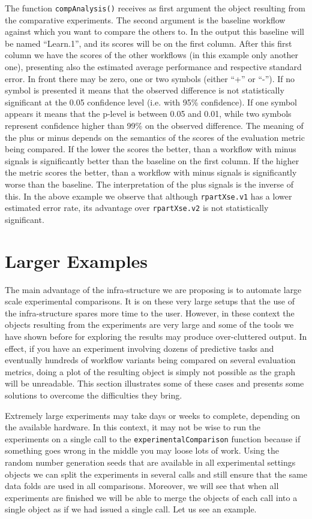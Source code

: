 \documentclass[10pt,a4paper]{article}
\begin{document}
The function \texttt{compAnalysis()} receives as first argument the
object resulting from the comparative experiments. The second argument
is the baseline workflow against which you want to compare the others
to. In the output this baseline will be named ``Learn.1'', and its
scores will be on the first column. After this first column we have
the scores of the other workflows (in this example only another one),
presenting also the estimated average performance and respective
standard error. In front there may be zero, one or two symbols (either
``+'' or ``-''). If no symbol is presented it means that the observed
difference is not statistically significant at the 0.05 confidence
level (i.e. with 95\% confidence). If one symbol appears it means that
the p-level is between 0.05 and 0.01, while two symbols represent
confidence higher than 99\% on the observed difference. The meaning of
the plus or minus depends on the semantics of the scores of the
evaluation metric being compared. If the lower the scores the better,
than a workflow with minus signals is significantly better than the
baseline on the first column. If the higher the metric scores the
better, than a workflow with minus signals is significantly worse than
the baseline. The interpretation of the plus signals is the inverse of
this. In the above example we observe that although
\texttt{rpartXse.v1} has a lower estimated error rate, its advantage
over \texttt{rpartXse.v2} is not statistically significant.


\section{Larger Examples}

The main advantage of the infra-structure we are proposing is to
automate large scale experimental comparisons. It is on these very
large setups that the use of the infra-structure spares more time to
the user. However, in these context the objects resulting from the
experiments are very large and some of the tools we have shown before
for exploring the results may produce over-cluttered output. In
effect, if you have an experiment involving dozens of predictive tasks
and eventually hundreds of workflow variants being compared on several
evaluation metrics, doing a plot of the resulting object is simply not
possible as the graph will be unreadable. This section illustrates
some of these cases and presents some solutions to overcome the
difficulties they bring.

Extremely large experiments may take days or weeks to complete,
depending on the available hardware. In this context, it may not be
wise to run the experiments on a single call to the
\texttt{experimentalComparison} function because if something goes
wrong in the middle you may loose lots of work. Using the random
number generation seeds that are available in all experimental
settings objects we can split the experiments in several calls and
still ensure that the same data folds are used in all
comparisons. Moreover, we will see that when all experiments are
finished we will be able to merge the objects of each call into a
single object as if we had issued a single call. Let us see an
example.
\end{document}

